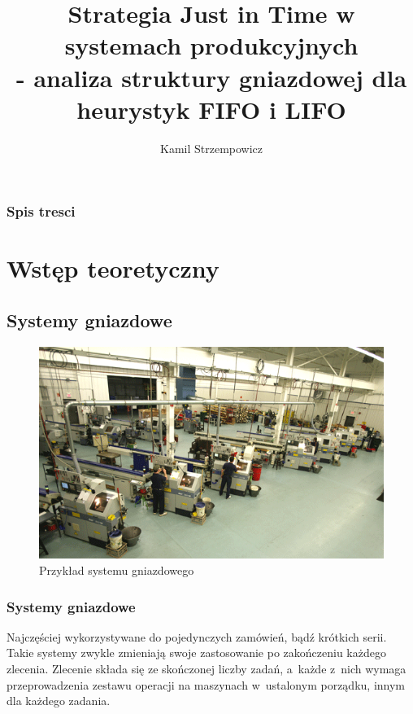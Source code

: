 \documentclass{prezentacja}
\title{Strategia Just in Time w systemach produkcyjnych\\ - analiza struktury gniazdowej dla heurystyk FIFO i LIFO}
\author{Kamil Strzempowicz}
\institute{Wydział Automatyki, Elektroniki i Informatyki}
\begin{document}


\begin{frame}
    \StronaTyt
\end{frame}
\begin{frame}
    \frametitle{Spis tresci}
    \tableofcontents
\end{frame}
\section{Wstęp teoretyczny}
\subsection{Systemy gniazdowe}
\begin{frame}
    
    \begin{figure}
        \vspace{-110pt}
        \includegraphics[width=\linewidth, keepaspectratio=true]{./obrazki/job-shop}
        \caption{\scriptsize Przykład systemu gniazdowego\cite{swiss}}
    \end{figure}
    
    \frametitle{Systemy gniazdowe}
    \vspace{60pt}
    Najczęściej wykorzystywane do pojedynczych zamówień, bądź krótkich serii. Takie systemy zwykle zmieniają swoje zastosowanie po zakończeniu każdego zlecenia. Zlecenie składa się ze skończonej liczby zadań, a~każde z~nich wymaga przeprowadzenia zestawu operacji na maszynach w~ustalonym porządku, innym dla każdego zadania.
    
   

\end{frame}
\end{document}
